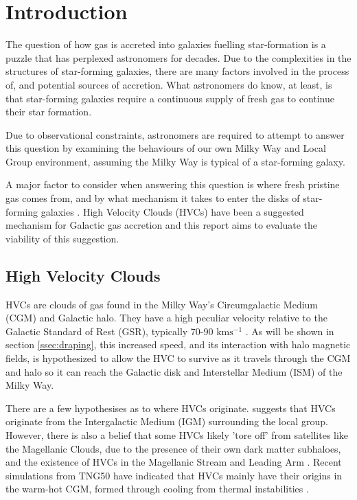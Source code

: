 \chapter{Introduction}
\label{cha:introduction}

The question of how gas is accreted into galaxies fuelling star-formation is a puzzle that has perplexed astronomers for decades. Due to the complexities in the structures of star-forming galaxies, there are many factors involved in the process of, and potential sources of accretion. What astronomers do know, at least, is that star-forming galaxies require a continuous supply of fresh gas to continue their star formation.


Due to observational constraints, astronomers are required to attempt to answer this question by examining the behaviours of our own Milky Way and Local Group environment, assuming the Milky Way is typical of a star-forming galaxy.


A major factor to consider when answering this question is where fresh pristine gas comes from, and by what mechanism it takes to enter the disks of star-forming galaxies \citep{ID8, ID28, ID49}. High Velocity Clouds (HVCs) have been a suggested mechanism for Galactic gas accretion and this report aims to evaluate the viability of this suggestion. 


\section{High Velocity Clouds}
\label{sec:hvcs}

HVCs are clouds of gas found in the Milky Way's Circumgalactic Medium (CGM) and Galactic halo. They have a high peculiar velocity relative to the Galactic Standard of Rest (GSR), typically 70-90 $\mathrm{km s^{-1}}$ \citep{ID7, ID8, ID66}. As will be shown in section \ref{ssec:draping}, this increased speed, and its interaction with halo magnetic fields, is hypothesized to allow the HVC to survive as it travels through the CGM and halo so it can reach the Galactic disk and Interstellar Medium (ISM) of the Milky Way.


There are a few hypothesises as to where HVCs originate. \cite{ID66} suggests that HVCs originate from the Intergalactic Medium (IGM) surrounding the local group. However, there is also a belief that some HVCs likely 'tore off' from satellites like the Magellanic Clouds, due to the presence of their own dark matter subhaloes, and the existence of HVCs in the Magellanic Stream and Leading Arm \citep{ID27, ID2}. Recent simulations from TNG50 have indicated that HVCs mainly have their origins in the warm-hot CGM, formed through cooling from thermal instabilities \citep{ID74}.



